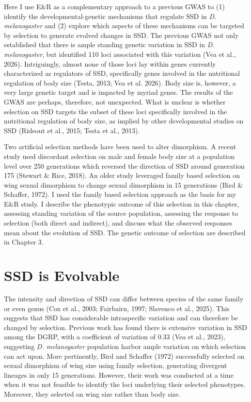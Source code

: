 \documentclass[12pt,reqno,oneside]{report}
\begin{document}
Here I use E\&R as a complementary approach to a previous GWAS to (1) identify the developmental-genetic mechanisms that regulate SSD in \textit{D. melanogaster} and (2) explore which aspects of these mechanisms can be targeted by selection to generate evolved changes in SSD. The previous GWAS not only established that there is ample standing genetic variation in SSD in \textit{D. melanogaster}, but identified 110 loci associated with this variation (Vea et al., 2026). Intriguingly, almost none of those loci lay within genes currently characterized as regulators of SSD, specifically genes involved in the nutritional regulation of body size (Testa, 2013; Vea et al. 2026). Body size is, however, a very large genetic target and is impacted by myriad genes. The results of the GWAS are perhaps, therefore, not unexpected. What is unclear is whether selection on SSD targets the subset of these loci specifically involved in the nutritional regulation of body size, as implied by other developmental studies on SSD (Rideout et al., 2015; Testa et al., 2013). 

Two artificial selection methods have been used to alter dimorphism. A recent study used discordant selection on male and female body size at a population level over 250 generations which reversed the direction of SSD around generation 175 (Stewart \& Rice, 2018). An older study leveraged family based selection on wing sexual dimorphism to change sexual dimorphism in 15 generations (Bird \& Schaffer, 1972). I used the family based selection approach as the basis for my E\&R study. I describe the phenotypic outcome of this selection in this chapter, assessing standing variation of the source population, assessing the response to selection (both direct and indirect), and discuss what the observed responses mean about the evolution of SSD. The genetic outcome of selection are described in Chapter 3.

\section{SSD is Evolvable}

The intensity and direction of SSD can differ between species of the same family or even genus (Cox et al., 2003; Fairbairn, 1997; Slavenco et al., 2025). This suggests that SSD has considerable intraspecific variation and can therefore be changed by selection. Previous work has found there is extensive variation in SSD among the DGRP, with a coefficient of variation of 0.33 (Vea et al., 2023), suggesting \textit{D. melanogaster} population harbor ample variation on which selection can act upon. More pertinently, Bird and Schaffer (1972) successfully selected on sexual dimorphism of wing size using family selection, generating divergent lineages in only 15 generations. However, their work was conducted at a time when it was not feasible to identify the loci underlying their selected phenotypes. Moreover, they selected on wing size rather than body size. 
\end{document}
